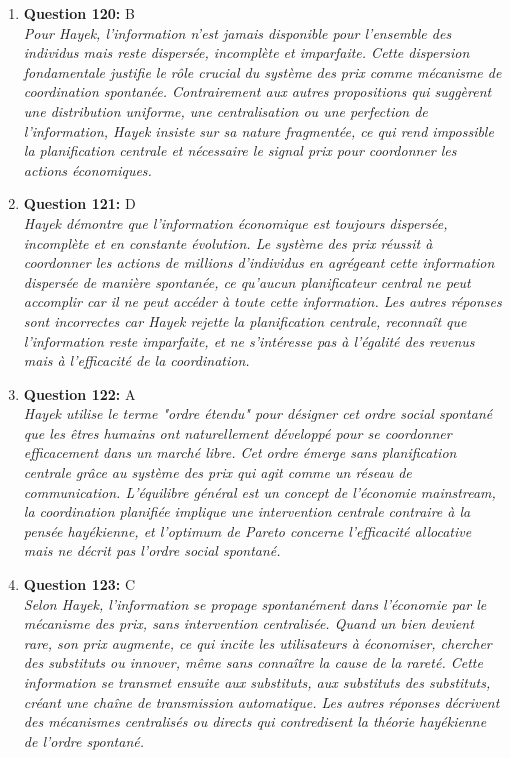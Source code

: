 \documentclass[12pt,a4paper]{article}
\begin{document}
\begin{enumerate}
\item \textbf{Question 120:} B
\\ \textit{Pour Hayek, l'information n'est jamais disponible pour l'ensemble des individus mais reste dispersée, incomplète et imparfaite. Cette dispersion fondamentale justifie le rôle crucial du système des prix comme mécanisme de coordination spontanée. Contrairement aux autres propositions qui suggèrent une distribution uniforme, une centralisation ou une perfection de l'information, Hayek insiste sur sa nature fragmentée, ce qui rend impossible la planification centrale et nécessaire le signal prix pour coordonner les actions économiques.}

\item \textbf{Question 121:} D
\\ \textit{Hayek démontre que l'information économique est toujours dispersée, incomplète et en constante évolution. Le système des prix réussit à coordonner les actions de millions d'individus en agrégeant cette information dispersée de manière spontanée, ce qu'aucun planificateur central ne peut accomplir car il ne peut accéder à toute cette information. Les autres réponses sont incorrectes car Hayek rejette la planification centrale, reconnaît que l'information reste imparfaite, et ne s'intéresse pas à l'égalité des revenus mais à l'efficacité de la coordination.}

\item \textbf{Question 122:} A
\\ \textit{Hayek utilise le terme "ordre étendu" pour désigner cet ordre social spontané que les êtres humains ont naturellement développé pour se coordonner efficacement dans un marché libre. Cet ordre émerge sans planification centrale grâce au système des prix qui agit comme un réseau de communication. L'équilibre général est un concept de l'économie mainstream, la coordination planifiée implique une intervention centrale contraire à la pensée hayékienne, et l'optimum de Pareto concerne l'efficacité allocative mais ne décrit pas l'ordre social spontané.}

\item \textbf{Question 123:} C
\\ \textit{Selon Hayek, l'information se propage spontanément dans l'économie par le mécanisme des prix, sans intervention centralisée. Quand un bien devient rare, son prix augmente, ce qui incite les utilisateurs à économiser, chercher des substituts ou innover, même sans connaître la cause de la rareté. Cette information se transmet ensuite aux substituts, aux substituts des substituts, créant une chaîne de transmission automatique. Les autres réponses décrivent des mécanismes centralisés ou directs qui contredisent la théorie hayékienne de l'ordre spontané.}


\end{enumerate}
\end{document}
